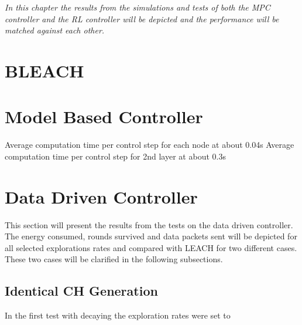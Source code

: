 \textit{In this chapter the results from the simulations and tests of both the MPC controller and the RL controller will be depicted and the performance will be matched against each other.}

\section{BLEACH}

\section{Model Based Controller}

Average computation time per control step for each node at about 0.04s
Average computation time per control step for 2nd layer at about 0.3s


\section{Data Driven Controller}
 This section will present the results from the tests on the data driven controller. The energy consumed, rounds survived and data packets sent will be depicted for all selected explorations rates and compared with LEACH for two different cases. These two cases will be clarified in the following subsections.  

\subsection{Identical CH Generation}
In the first test with decaying the exploration rates were set to 